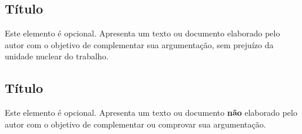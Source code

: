 \documentclass[
  oneside, %
  english,
  brazil
]{abntbibufjf}
\begin{document}
\begin{thebibliography}{99}



\end{thebibliography}



\begin{apendices}

  \chapter{\apendseq Título}

  Este elemento é opcional. Apresenta um texto ou documento elaborado pelo autor com o objetivo de complementar sua argumentação,
  sem prejuízo da unidade nuclear do trabalho.

\end{apendices}


\begin{anexos}

  \chapter{\anexoseq Título}

  Este elemento é opcional. Apresenta um texto ou documento \textbf{não} elaborado pelo autor com o objetivo de complementar ou comprovar sua
  argumentação.


\end{anexos}


\end{document}

